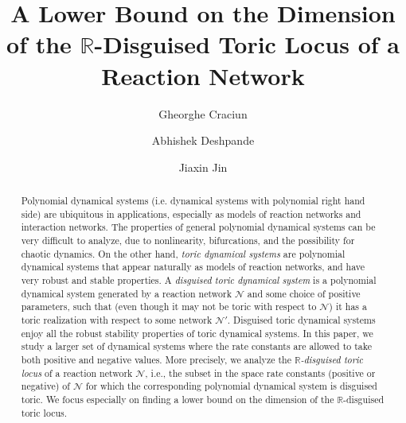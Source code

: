 \documentclass[11pt]{article}
\theoremstyle{plain}
\theoremstyle{definition}
\theoremstyle{remark}
\newcommand\RR{\mathbb{R}}
\begin{document}
\title{A Lower Bound on the Dimension of the $\RR$-Disguised Toric Locus of a Reaction Network}

\author[1]{
         Gheorghe Craciun%
}
\author[2]{
        Abhishek Deshpande%
}
\author[3]{
        Jiaxin Jin%
}

\date{} 

\maketitle

\begin{abstract}
\noindent
Polynomial dynamical systems (i.e. dynamical systems with polynomial right hand side) are ubiquitous in applications, especially as models of reaction networks and interaction networks. The properties of general polynomial dynamical systems can be very difficult to analyze, due to nonlinearity, bifurcations, and the possibility for chaotic dynamics. On the other hand, {\em toric dynamical systems} are polynomial dynamical systems that appear naturally as models of reaction networks, and have very robust and stable properties. A {\em disguised toric dynamical system} is a polynomial dynamical system generated by a reaction network $\mathcal N$ and some choice of positive parameters, such that (even though it may not be toric with respect to $\mathcal N$) it has a toric realization with respect to some  network $\mathcal N'$. Disguised toric dynamical systems enjoy all the robust stability properties of toric dynamical systems. In this paper, we study a larger set of dynamical systems where the rate constants are allowed to take both positive and negative values. More precisely, we analyze the \emph{$\RR$-disguised toric locus} of a reaction network $\mathcal N$, i.e., the subset in the space rate constants (positive or negative) of $\mathcal N$ for which the corresponding polynomial dynamical system is disguised toric. We focus especially on finding a lower bound on the dimension of the $\RR$-disguised toric locus. 
\end{abstract}
\end{document}
